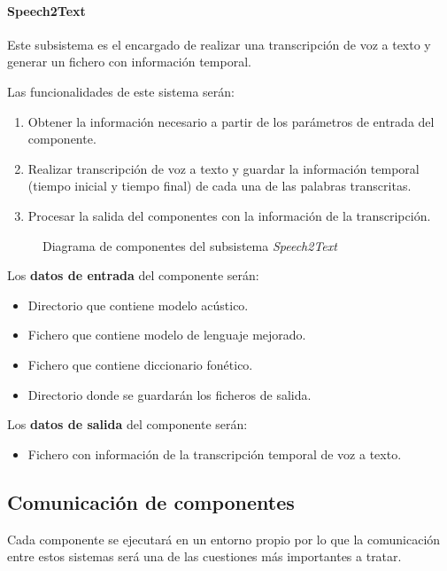 \documentclass[../main.tex]{subfiles}
\begin{document}
\paragraph{Speech2Text}\label{par:speech2text}
Este subsistema es el encargado de realizar una transcripción de voz a texto y generar un fichero con información temporal.


Las funcionalidades de este sistema serán:
\begin{enumerate}
    \item Obtener la información necesario a partir de los parámetros de entrada del componente.
    \item Realizar transcripción de voz a texto y guardar la información temporal (tiempo inicial y tiempo final) de cada una de las palabras transcritas.
    \item Procesar la salida del componentes con la información de la transcripción.%
\end{enumerate}

\begin{figure}[H]
    \centering
    
    \label{fig:components_speech2text}
    \caption{Diagrama de componentes del subsistema \textit{Speech2Text}}
\end{figure}

Los \textbf{datos de entrada} del componente serán:
\begin{itemize}
    \item Directorio que contiene modelo acústico.
    \item Fichero que contiene modelo de lenguaje mejorado.
    \item Fichero que contiene diccionario fonético.
    \item Directorio donde se guardarán los ficheros de salida.
\end{itemize}

Los \textbf{datos de salida} del componente serán:
\begin{itemize}
    \item Fichero con información de la transcripción temporal de voz a texto.
\end{itemize}

\subsection{Comunicación de componentes}\label{subsec:comunicacion_componentes}
Cada componente se ejecutará en un entorno propio por lo que la comunicación entre estos sistemas será una de las cuestiones más importantes a tratar.
\end{document}
